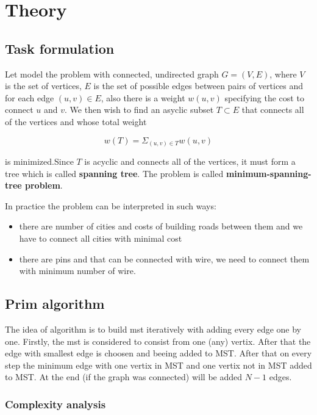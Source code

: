\section*{Theory}

\subsection*{Task formulation}

Let model the problem with connected, undirected graph $G = (V, E)$,
where $V$ is the set of vertices, $E$ is the set of possible edges between pairs of vertices and for each edge $(u, v) \in E$, also there is a weight $w(u, v)$ specifying the cost
to connect $u$ and $v$. We then wish to find an asyclic subset $T \subset E$ that connects all of the vertices and whose total weight

\begin{equation*}
    w(T) = \Sigma_{(u, v) \in T} w(u, v)
\end{equation*}

is minimized.Since $T$ is acyclic and connects all of the vertices, it must form a tree which is called \textbf{spanning tree}. The problem is called \textbf{minimum-spanning-tree problem}.

In practice the problem can be interpreted in such ways:

\begin{itemize}
    \item there are number of cities and costs of building roads between them and we have to connect all cities with minimal cost
    \item there are pins and that can be connected with wire, we need to connect them with minimum number of wire.
\end{itemize}

\subsection*{Prim algorithm}

The idea of algorithm is to build mst iteratively with adding every edge one by one.
Firstly, the mst is considered to consist from one (any) vertix. After that the edge with smallest edge is choosen and beeing added to MST.
After that on every step the minimum edge with one vertix in MST and one vertix not in MST added to MST.
At the end (if the graph was connected) will be added $N - 1$ edges. 

\subsubsection*{Complexity analysis}

